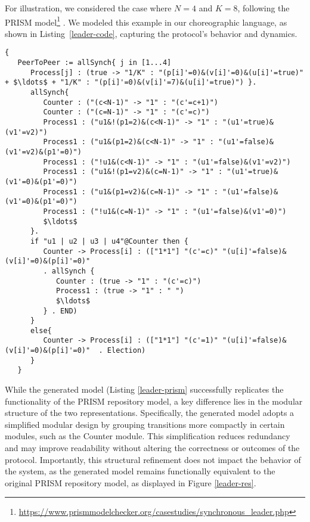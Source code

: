 For illustration, we considered the case where $ N=4 $ and $ K=8 $, following the PRISM model\footnote{\url{https://www.prismmodelchecker.org/casestudies/synchronous_leader.php}} . We modeled this example in our choreographic language, as shown in Listing~\ref{leader-code}, capturing the protocol's behavior and dynamics.

\begin{lstlisting}[style=chor-color,caption={Choreography for the Synchronous Leader Election Protocol.},captionpos=b,label={leader-code}]
   {
   PeerToPeer := allSynch{ j in [1...4]
      Process[j] : (true -> "1/K" : "(p[i]'=0)&(v[i]'=0)&(u[i]'=true)" + $\ldots$ + "1/K" : "(p[i]'=0)&(v[i]'=7)&(u[i]'=true)") }.
      allSynch{
         Counter : ("(c<N-1)" -> "1" : "(c'=c+1)")
         Counter : ("(c=N-1)" -> "1" : "(c'=c)")
         Process1 : ("u1&!(p1=2)&(c<N-1)" -> "1" : "(u1'=true)&(v1'=v2)")
         Process1 : ("u1&(p1=2)&(c<N-1)" -> "1" : "(u1'=false)&(v1'=v2)&(p1'=0)")
         Process1 : ("!u1&(c<N-1)" -> "1" : "(u1'=false)&(v1'=v2)")
         Process1 : ("u1&!(p1=v2)&(c=N-1)" -> "1" : "(u1'=true)&(v1'=0)&(p1'=0)")
         Process1 : ("u1&(p1=v2)&(c=N-1)" -> "1" : "(u1'=false)&(v1'=0)&(p1'=0)")
         Process1 : ("!u1&(c=N-1)" -> "1" : "(u1'=false)&(v1'=0)")
         $\ldots$
      }.
      if "u1 | u2 | u3 | u4"@Counter then {
         Counter -> Process[i] : (["1*1"] "(c'=c)" "(u[i]'=false)&(v[i]'=0)&(p[i]'=0)"
         . allSynch {
            Counter : (true -> "1" : "(c'=c)")
            Process1 : (true -> "1" : " ")
            $\ldots$               
         } . END)
      }
      else{
         Counter -> Process[i] : (["1*1"] "(c'=1)" "(u[i]'=false)&(v[i]'=0)&(p[i]'=0)"  . Election)
      }      
   }
   \end{lstlisting} 
   While the generated model (Listing \ref{leader-prism} successfully replicates the functionality of 
   the PRISM repository model, a key difference lies in the modular 
   structure of the two representations. 
   Specifically, the generated model adopts a simplified modular design by 
   grouping transitions more compactly in certain modules, such as the Counter module. 
   This simplification reduces redundancy and may improve readability without altering the correctness or outcomes of the protocol. Importantly, this structural refinement does not impact the behavior of the system, as the generated model remains functionally equivalent to the original PRISM repository model, as displayed in Figure \ref{leader-res}.

